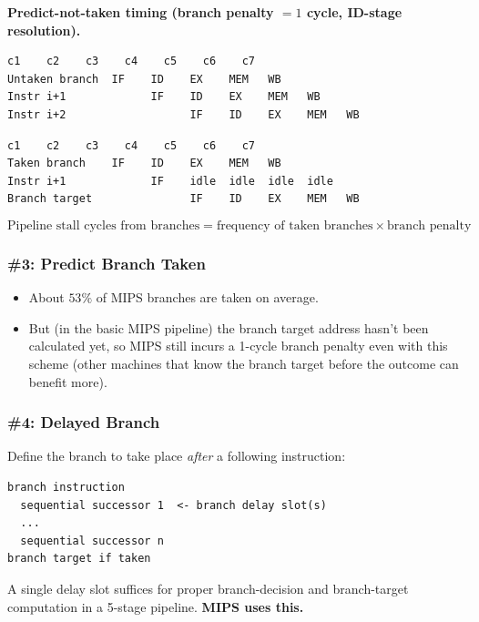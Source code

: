 \textbf{Predict-not-taken timing (branch penalty $=1$ cycle, ID-stage resolution).}
\begin{lstlisting}[caption={Not taken (no stall)}]
                c1    c2    c3    c4    c5    c6    c7
Untaken branch  IF    ID    EX    MEM   WB
Instr i+1             IF    ID    EX    MEM   WB
Instr i+2                   IF    ID    EX    MEM   WB
\end{lstlisting}
\begin{lstlisting}[caption={Taken (1 idle cycle)}]
                c1    c2    c3    c4    c5    c6    c7
Taken branch    IF    ID    EX    MEM   WB
Instr i+1             IF    idle  idle  idle  idle
Branch target               IF    ID    EX    MEM   WB
\end{lstlisting}
\begin{prop}
\[
  \text{Pipeline stall cycles from branches} = \text{frequency of taken branches} \times \text{branch penalty}
\]
\end{prop}

\subsubsection{\#3: Predict Branch Taken}
\begin{itemize}
  \item About $53\%$ of MIPS branches are taken on average.
  \item But (in the basic MIPS pipeline) the branch target address hasn't
  been calculated yet, so MIPS still incurs a 1-cycle branch penalty even
  with this scheme (other machines that know the branch target before the
  outcome can benefit more).
\end{itemize}

\subsubsection{\#4: Delayed Branch}

\begin{definition}
Define the branch to take place \emph{after} a following instruction:
\begin{lstlisting}
branch instruction
  sequential successor 1  <- branch delay slot(s)
  ...
  sequential successor n
branch target if taken
\end{lstlisting}
A single delay slot suffices for proper branch-decision and branch-target
computation in a 5-stage pipeline. \textbf{MIPS uses this.}
\end{definition}

